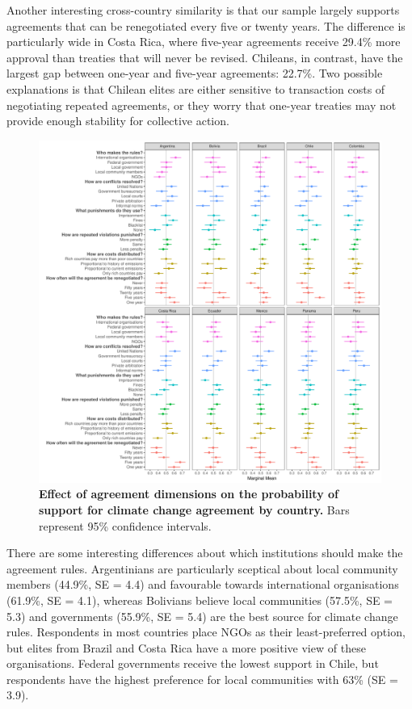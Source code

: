 \documentclass[a4paper,12pt]{article}
\begin{document}
Another interesting cross-country similarity is that our sample largely supports agreements that can be renegotiated every five or twenty years. The difference is particularly wide in Costa Rica, where five-year agreements receive 29.4\% more approval than treaties that will never be revised. Chileans, in contrast, have the largest gap between one-year and five-year agreements: 22.7\%. Two possible explanations is that Chilean elites are either sensitive to transaction costs of negotiating repeated agreements, or they worry that one-year treaties may not provide enough stability for collective action.

\begin{figure}[H]
	\centering
	\includegraphics[width=\linewidth]{countries.pdf}
	\caption{\textbf{Effect of agreement dimensions on the probability of support for climate change agreement by country.} Bars represent 95\% confidence intervals.}
	\label{fig:countries}
\end{figure}

There are some interesting differences about which institutions should make the agreement rules. Argentinians are particularly sceptical about local community members (44.9\%, SE = 4.4) and favourable towards international organisations (61.9\%, SE = 4.1), whereas Bolivians believe local communities (57.5\%, SE = 5.3) and governments (55.9\%, SE = 5.4) are the best source for climate change rules. Respondents in most countries place NGOs as their least-preferred option, but elites from Brazil and Costa Rica have a more positive view of these organisations. Federal governments receive the lowest support in Chile, but respondents have the highest preference for local communities with 63\% (SE = 3.9). 
\end{document}
